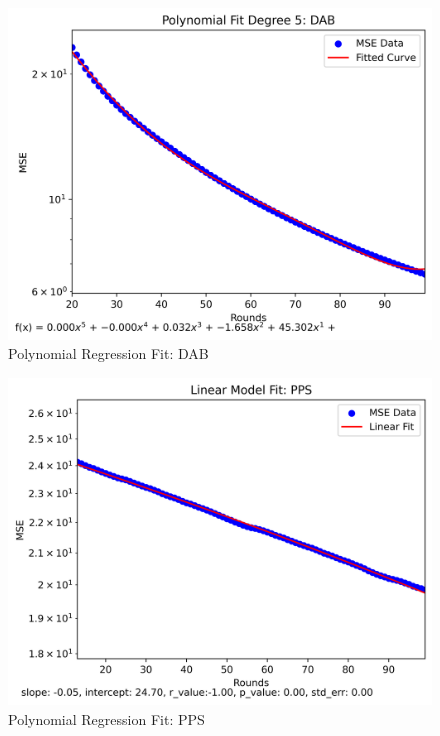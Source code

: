  \begin{figure}[H]
     \centering
     \includegraphics[width=\linewidth]{figures/Simulation_outcomes/RingOfCliques/DAB/DAB_modelfitting_rounds_99_model_2.png}
     \caption{Polynomial Regression Fit: DAB}
     \label{fig:dabRingOfCliquesModelFit}
 \end{figure}
\begin{figure}[H]
    \centering
    \includegraphics[width=\linewidth]{figures/Simulation_outcomes/RingOfCliques/PPS/PPS_modelfitting_rounds_99_model_0.png}
    \caption{Polynomial Regression Fit: PPS}
    \label{fig:ppsRingOfCliquesModelFit}
\end{figure}

